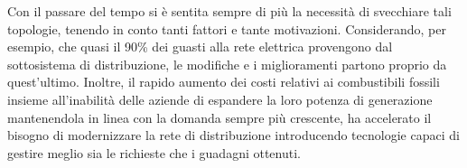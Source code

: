 \newline \newline
Con il passare del tempo si è sentita sempre di più la necessità di svecchiare tali topologie, tenendo in conto tanti fattori e tante motivazioni.\newline
Considerando, per esempio, che quasi il 90\% dei guasti alla rete elettrica provengono dal sottosistema di distribuzione, le modifiche e i miglioramenti partono proprio da quest'ultimo. Inoltre, il rapido aumento dei costi relativi ai combustibili fossili insieme all'inabilità delle aziende di espandere la loro potenza di generazione mantenendola in linea con la domanda sempre più crescente, ha accelerato il bisogno di modernizzare la rete di distribuzione introducendo tecnologie capaci di gestire meglio sia le richieste che i guadagni ottenuti. \newline
\begin{figure}[h]
\end{figure}

